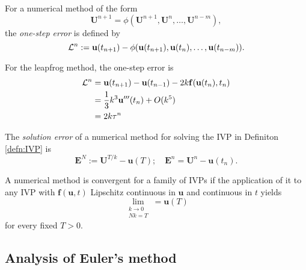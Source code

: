 \begin{defn}
  For a numerical method of the form
  \begin{displaymath}
    \mathbf{U}^{n+1}=\phi( \mathbf{U}^{n+1}, \mathbf{U}^{n},
    \ldots, \mathbf{U}^{n-m}),
  \end{displaymath}
the \emph{one-step error} is defined by
\begin{equation}
  \label{eq:one-step}
  {\cal L}^n:=\mathbf{u}(t_{n+1})-\phi(\mathbf{u}(t_{n+1}),
  \mathbf{u}(t_{n}),\ldots,\mathbf{u}(t_{n-m})).
\end{equation}
\end{defn}

\begin{exm}
  For the leapfrog method, the one-step error is
  \begin{displaymath}
    \begin{aligned}
      {\cal
        L}^n&=\mathbf{u}(t_{n+1})-\mathbf{u}(t_{n-1})-2k\mathbf{f}(\mathbf{u}(t_n),t_n)\\
      &=\frac{1}{3}k^3\mathbf{u}'''(t_n)+O(k^5)\\
      &=2k\mathbf{\tau}^n
    \end{aligned}
  \end{displaymath}
\end{exm}

\begin{defn}
  The \emph{solution error} of a numerical method for solving the IVP
  in Definiton \ref{defn:IVP} is
  \begin{equation}
    \label{eq:solutionError}
    \mathbf{E}^N:=\mathbf{U}^{T/k}-\mathbf{u}(T);\quad
    \mathbf{E}^n=\mathbf{U}^n-\mathbf{u}(t_n).
  \end{equation}
\end{defn}

\begin{defn}\label{defn:convergent}
  A numerical method is convergent for a family of IVPs if the
  application of it to any IVP with $\mathbf{f}(\mathbf{u},t)$
  Lipschitz continuous in $\mathbf{u}$ and continuous in $t$ yields
  \begin{equation}
    \label{eq:convergence}
    \lim_{\substack{k\rightarrow 0\\Nk=T}}=\mathbf{u}(T)
  \end{equation} 
for every fixed $T> 0$.
\end{defn}

\subsection{Analysis of Euler's method}

